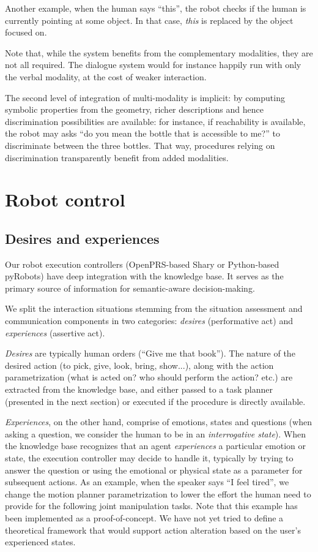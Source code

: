 \documentclass[letterpaper, 10 pt, conference]{ieeeconf}  %
\begin{document}
Another example, when the human says ``this'', the robot checks if the human is
currently pointing at some object. In that case, \emph{this} is replaced by the
object focused on.

Note that, while the system benefits from the complementary modalities, they
are not all required. The dialogue system would for instance happily run with
only the verbal modality, at the cost of weaker interaction.

The second level of integration of multi-modality is implicit: by computing
symbolic properties from the geometry, richer descriptions and hence
discrimination possibilities are available: for instance, if reachability is
available, the robot may asks ``do you mean the bottle that is accessible to
me?'' to discriminate between the three bottles. That way, procedures relying
on discrimination transparently benefit from added modalities.

\section{Robot control}
\label{sect|ctrl}

\subsection{Desires and experiences}

Our robot execution controllers (OpenPRS-based {\sc Shary} or Python-based {\sc
pyRobots}) have deep integration with the knowledge base. It serves as the primary source of information for semantic-aware decision-making.

We split the interaction situations stemming from the situation assessment and
communication components in two categories: \emph{desires} (performative act)
and \emph{experiences} (assertive act).

\emph{Desires} are typically human orders (``Give me that book''). The nature
of the desired action (to pick, give, look, bring, show...), along with the
action parametrization (what is acted on? who should perform the action? etc.)
are extracted from the knowledge base, and either passed to a task planner
(presented in the next section) or executed if the procedure is directly
available.

\emph{Experiences}, on the other hand, comprise of emotions, states and
questions (when asking a question, we consider the human to be in an
\emph{interrogative state}). When the knowledge base recognizes that an agent
\emph{experiences} a particular emotion or state, the execution controller may
decide to handle it, typically by trying to answer the question or using the
emotional or physical state as a parameter for subsequent actions. As an example,
when the speaker says ``I feel tired'', we change the motion planner
parametrization to lower the effort the human need to provide for the following
joint manipulation tasks. Note that this example has been implemented as a
proof-of-concept. We have not yet tried to define a theoretical framework that
would support action alteration based on the user's experienced states.
\end{document}
